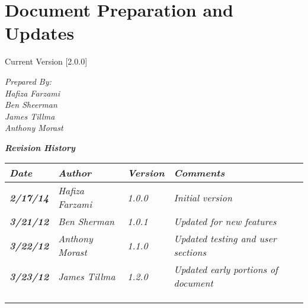 
\chapter{Document Preparation and Updates}

Current Version [2.0.0]
\vspace*{5mm}

{\color{MSBlue3}
\noindent
\textit{Prepared By:}\\
\textit{Hafiza Farzami}\\
\textit{Ben Sheerman}\\
\textit{James Tillma}\\
\textit{Anthony Morast}\\
}

\vfill
\noindent
{\color{color02} \textit{\textbf{Revision History}}}\\
\begin{tabular}{|>{\raggedright}p{1.5cm}|>{\raggedright}p{3cm}|>{\raggedright}p{1.5cm}|>{\raggedright}p{9cm}|}
\hline
\textit{\textbf{Date}} &  \textit{\textbf{Author}} & \textit{\textbf{Version}} & \textit{\textbf{Comments}}\tabularnewline
\hline
 \textit{\textbf{2/17/14}} & \textit{Hafiza Farzami} & \textit{1.0.0} & \textit{Initial version}\tabularnewline
\hline
\textit{\textbf{3/21/12}} & \textit{Ben Sherman} & \textit{1.0.1} & \textit{Updated for new features}\tabularnewline
\hline
\textit{\textbf{3/22/12}} & \textit{Anthony Morast} & \textit{1.1.0} & \textit{Updated testing and user sections}\tabularnewline
 \hline
\textit{\textbf{3/23/12}} & \textit{James Tillma} & \textit{1.2.0} & \textit{Updated early portions of document}\tabularnewline
\hline
 &  &  & \tabularnewline
\hline
 &  &  & \tabularnewline
\hline
 &  &  & \tabularnewline
\hline
\end{tabular}
\vfill

